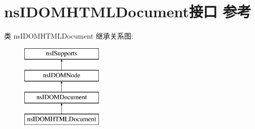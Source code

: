 \hypertarget{interfacens_i_d_o_m_h_t_m_l_document}{}\section{ns\+I\+D\+O\+M\+H\+T\+M\+L\+Document接口 参考}
\label{interfacens_i_d_o_m_h_t_m_l_document}
类 ns\+I\+D\+O\+M\+H\+T\+M\+L\+Document 继承关系图\+:\begin{figure}[H]
\begin{center}
\leavevmode
\includegraphics[height=4.000000cm]{interfacens_i_d_o_m_h_t_m_l_document}
\end{center}
\end{figure}
